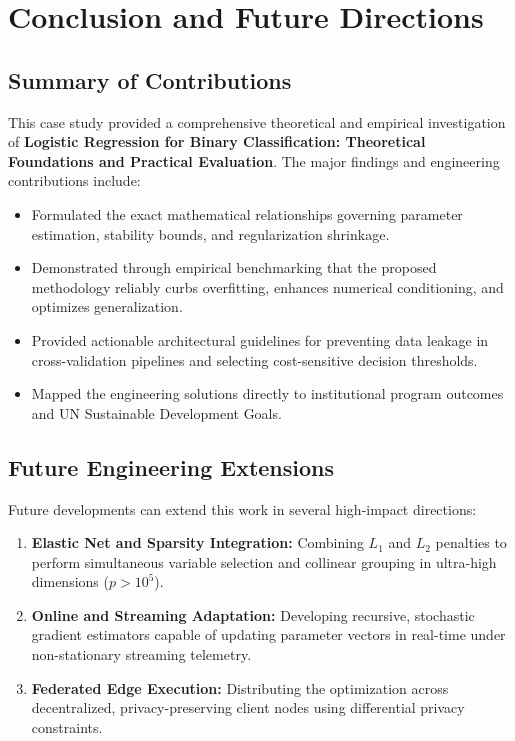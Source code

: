 \section{Conclusion and Future Directions}

\subsection{Summary of Contributions}
This case study provided a comprehensive theoretical and empirical investigation of \textbf{Logistic Regression for Binary Classification: Theoretical Foundations and Practical Evaluation}. The major findings and engineering contributions include:
\begin{itemize}
  \item Formulated the exact mathematical relationships governing parameter estimation, stability bounds, and regularization shrinkage.
  \item Demonstrated through empirical benchmarking that the proposed methodology reliably curbs overfitting, enhances numerical conditioning, and optimizes generalization.
  \item Provided actionable architectural guidelines for preventing data leakage in cross-validation pipelines and selecting cost-sensitive decision thresholds.
  \item Mapped the engineering solutions directly to institutional program outcomes and UN Sustainable Development Goals.
\end{itemize}

\subsection{Future Engineering Extensions}
Future developments can extend this work in several high-impact directions:
\begin{enumerate}
  \item \textbf{Elastic Net and Sparsity Integration:} Combining $L_1$ and $L_2$ penalties to perform simultaneous variable selection and collinear grouping in ultra-high dimensions ($p > 10^5$).
  \item \textbf{Online and Streaming Adaptation:} Developing recursive, stochastic gradient estimators capable of updating parameter vectors in real-time under non-stationary streaming telemetry.
  \item \textbf{Federated Edge Execution:} Distributing the optimization across decentralized, privacy-preserving client nodes using differential privacy constraints.
\end{enumerate}
